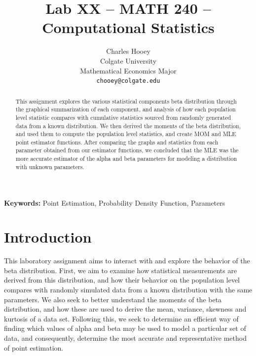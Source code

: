 \documentclass{article}\usepackage[]{graphicx}\usepackage[]{xcolor}
\begin{document}
\vspace{-1in}
\title{Lab XX -- MATH 240 -- Computational Statistics}

\author{
  Charles Hooey \\
  Colgate University  \\
  Mathematical Economics Major  \\
  {\tt chooey@colgate.edu}
}

\date{}

\maketitle

\begin{multicols}{2}
\begin{abstract}
This assignment explores the various statistical components beta distribution through the graphical summarization of each component, and analysis of how each population level statistic compares with cumulative statistics sourced from randomly generated data from a known distribution. We then derived the moments of the beta distribution, and used them to compute the population level statistics, and create MOM and MLE point estimator functions. After comparing the graphs and statistics from each parameter obtained from our estimator functions, we concluded that the MLE was the more accurate estimator of the alpha and beta parameters for modeling a distribution with unknown parameters. 
\end{abstract}

\noindent \textbf{Keywords:} Point Estimation, Probability Density Function, Parameters

\section{Introduction}
This laboratory assignment aims to interact with and explore the behavior of the beta distribution. First, we aim to examine how statistical measurements are derived from this distribution, and how their behavior on the population level compares with randomly simulated data from a known distribution with the same parameters. We also seek to better understand the moments of the beta distribution, and how these are used to derive the mean, variance, skewness and kurtosis of a data set. Following this, we seek to determine an efficient way of finding which values of alpha and beta may be used to model a particular set of data, and consequently, determine the most accurate and representative method of point estimation.



\end{multicols}
\end{document}
